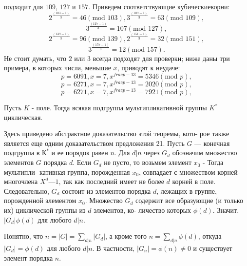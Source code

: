 \documentclass{../template/mai_book}
\begin{document}
\pagebreak
\noindent подходит для $109$, $127$ и $157$. Приведем соответствующие кубические\linebreak корни:
$$2^{\frac{(103-1)}{3}} = 46 (\text{mod } 103), 3^{\frac{(109-1)}{3}} = 63 (\text{mod } 109),$$
$$3^{\frac{(127-1)}{3}} = 107 (\text{mod } 127),$$
$$2^{\frac{(139-1)}{3}} = 96 (\text{mod } 139), 2^{\frac{(151-1)}{3}} = 32 (\text{mod } 151),$$
$$3^{\frac{(157-1)}{3}} = 12 (\text{mod } 157).$$
Не стоит думать, что $2$ или $3$ всегда подходят для проверки; ниже даны
три примера, в которых числа, меньшие $x$, приводят к неудаче:
$$p = 6091, x = 7, x^{frac{p - 1}{3}} = 5346(\text{mod }p),$$
$$p = 6271, x = 7, x^{frac{p - 1}{3}} = 2020(\text{mod }p),$$
$$p = 6271, x = 7, x^{frac{p - 1}{3}} = 7921(\text{mod }p),$$
\begin{thm}
Пусть $K$ - поле. Тогда всякая подгруппа мультипликативной группы $K^*$ циклическая.
\end{thm}
\begin{myproof}
Здесь приведено абстрактное доказательство этой теоремы, кото­-\linebreak
рое также является еще одним доказательством предложения 21.­\linebreak
Пусть $G$ — конечная подгруппа в $К^*$ и ее порядок равен $n$. Для­\linebreak
$d | n$ через $G_d$ обозначим множество элементов $G$ порядка $d$.­\linebreak
Если $G_d$ не пусто, то возьмем элемент $x_0$ - Тогда мультипли­-­\linebreak
кативная группа, порожденная $x_0$, совпадает с множеством корней­\linebreak
многочлена $X^d — 1$, так как последний имеет не более $d$ корней в­\linebreak
поле. Следовательно, $G_d$ состоит из элементов порядка $d$, лежащих­\linebreak
в группе, порожденной элементом $x_0$. Множество $G_d$ содержит все­\linebreak
образующие (и только их) циклической группы из $d$ элементов, ко­-­\linebreak
личество которых $\phi(d)$. Значит, $|G_d|\phi(d)$ для любого $d|n$.­

\noindent Понятно, что $n = |G| = \sum_{d|n} |G_d|$, а кроме того $n = \sum_{d|n}\phi(d)$,­\linebreak
откуда $|G_d| = \phi(d)$ для любого $d|n$. В частности, $|G_n| = \phi(n) \ne0$\linebreak
и существует элемент порядка $n$.
\end{myproof}
\end{document}
